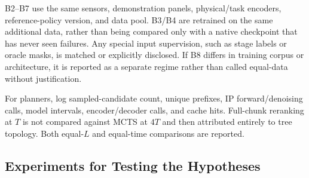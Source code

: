 \documentclass[
  10pt,
]{article}
\begin{document}
B2--B7 use the same sensors, demonstration panels, physical/task encoders, reference-policy version, and data pool. B3/B4 are retrained on the same additional data, rather than being compared only with a native checkpoint that has never seen failures. Any special input supervision, such as stage labels or oracle masks, is matched or explicitly disclosed. If B8 differs in training corpus or architecture, it is reported as a separate regime rather than called equal-data without justification.

For planners, log sampled-candidate count, unique prefixes, IP forward/denoising calls, model intervals, encoder/decoder calls, and cache hits. Full-chunk reranking at \(T\) is not compared against MCTS at \(4T\) and then attributed entirely to tree topology. Both equal-\(L\) and equal-time comparisons are reported.

\hypertarget{cuxe1c-thuxed-nghiux1ec7m-xuxe1c-nhux1eadn-giux1ea3-thuyux1ebft}{%
\subsection{Experiments for Testing the Hypotheses}\label{cuxe1c-thuxed-nghiux1ec7m-xuxe1c-nhux1eadn-giux1ea3-thuyux1ebft}}
\end{document}
